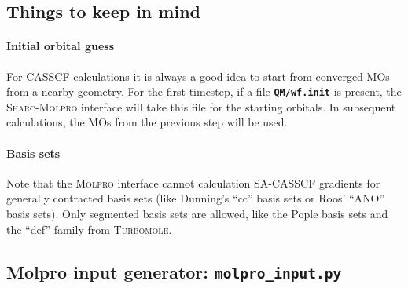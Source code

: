 \documentclass[a4paper,11pt,DIV=15,openany,twoside=false]{scrbook}
\newcommand{\sharc}{\textsc{Sharc}}
\newcommand{\ttt}[1]{\textbf{\texttt{#1}}}
\begin{document}
\subsection{Things to keep in mind}

\paragraph{Initial orbital guess}

For CASSCF calculations it is always a good idea to start from converged MOs from a nearby geometry. For the first timestep, if a file \ttt{QM/wf.init} is present, the \sharc-\textsc{Molpro} interface will take this file for the starting orbitals. In subsequent calculations, the MOs from the previous step will be used.

% 
% 

\paragraph{Basis sets}

Note that the \textsc{Molpro} interface cannot calculation SA-CASSCF gradients for generally contracted basis sets (like Dunning's ``cc'' basis sets or Roos' ``ANO'' basis sets). Only segmented basis sets are allowed, like the Pople basis sets and the ``def'' family from \textsc{Turbomole}.

\subsection{Molpro input generator: \ttt{molpro\_input.py}}\label{sec:molpro_input.py}
\end{document}
